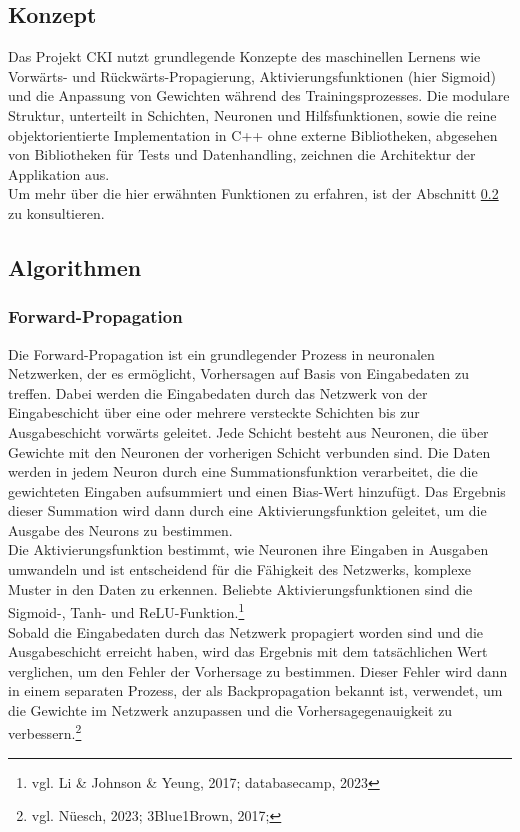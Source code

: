 \subsection{Konzept}
Das Projekt CKI nutzt grundlegende Konzepte des maschinellen Lernens wie Vorwärts- und Rückwärts-Propagierung, Aktivierungsfunktionen (hier Sigmoid) und die Anpassung von Gewichten während des Trainingsprozesses. Die modulare Struktur, unterteilt in Schichten, Neuronen und Hilfsfunktionen, sowie die reine objektorientierte Implementation in C++ ohne externe Bibliotheken, abgesehen von Bibliotheken für Tests und Datenhandling, zeichnen die Architektur der Applikation aus.
\\
Um mehr über die hier erwähnten Funktionen zu erfahren, ist der Abschnitt \ref{sec:RealAlgorithmen} zu konsultieren.

\subsection{Algorithmen}
\label{sec:RealAlgorithmen}
\subsubsection{ Forward-Propagation}
\label{sec:RealForwardPropagation}
Die Forward-Propagation ist ein grundlegender Prozess in neuronalen Netzwerken, der es ermöglicht, Vorhersagen auf Basis von Eingabedaten zu treffen. Dabei werden die Eingabedaten durch das Netzwerk von der Eingabeschicht über eine oder mehrere versteckte Schichten bis zur Ausgabeschicht vorwärts geleitet. Jede Schicht besteht aus Neuronen, die über Gewichte mit den Neuronen der vorherigen Schicht verbunden sind. Die Daten werden in jedem Neuron durch eine Summationsfunktion verarbeitet, die die gewichteten Eingaben aufsummiert und einen Bias-Wert hinzufügt. Das Ergebnis dieser Summation wird dann durch eine Aktivierungsfunktion geleitet, um die Ausgabe des Neurons zu bestimmen.
\\
Die Aktivierungsfunktion bestimmt, wie Neuronen ihre Eingaben in Ausgaben umwandeln und ist entscheidend für die Fähigkeit des Netzwerks, komplexe Muster in den Daten zu erkennen. Beliebte Aktivierungsfunktionen sind die Sigmoid-, Tanh- und ReLU-Funktion.\footnote{vgl. Li \& Johnson \& Yeung, 2017; databasecamp, 2023}
\\
Sobald die Eingabedaten durch das Netzwerk propagiert worden sind und die Ausgabeschicht erreicht haben, wird das Ergebnis mit dem tatsächlichen Wert verglichen, um den Fehler der Vorhersage zu bestimmen. Dieser Fehler wird dann in einem separaten Prozess, der als Backpropagation bekannt ist, verwendet, um die Gewichte im Netzwerk anzupassen und die Vorhersagegenauigkeit zu verbessern.\footnote{vgl. Nüesch, 2023;  3Blue1Brown, 2017;}
